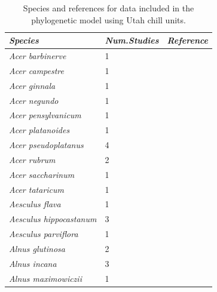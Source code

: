 \documentclass[11pt]{article}
\begin{document}
\begingroup\footnotesize
\begin{longtable}{p{}p{}p{}}
\caption{Species and references for data included in the phylogenetic model using Utah chill units.} \\ 
  \hline
\emph{Species} & \emph{Num.Studies} & \emph{Reference} \\ 
  \hline \endhead  \hline
\emph{Acer barbinerve} &   1 & \emph{\citep{zohner2016}} \\ 
  \emph{Acer campestre} &   1 & \emph{\citep{zohner2016}} \\ 
  \emph{Acer ginnala} &   1 & \emph{\citep{zohner2016}} \\ 
  \emph{Acer negundo} &   1 & \emph{\citep{Laube:2014a}} \\ 
  \emph{Acer pensylvanicum} &   1 & \emph{\citep{flynn2018}} \\ 
  \emph{Acer platanoides} &   1 & \emph{\citep{zohner2016}} \\ 
  \emph{Acer pseudoplatanus} &   4 & \emph{\citep{Basler:2012,Basler:2014aa,Laube:2014a,malyshev2018}} \\ 
  \emph{Acer rubrum} &   2 & \emph{\citep{flynn2018,nanninga17}} \\ 
  \emph{Acer saccharinum} &   1 & \emph{\citep{Webb:1977}} \\ 
  \emph{Acer tataricum} &   1 & \emph{\citep{Laube:2014a}} \\ 
  \emph{Aesculus flava} &   1 & \emph{\citep{zohner2016}} \\ 
  \emph{Aesculus hippocastanum} &   3 & \emph{\citep{Basler:2012,Laube:2014a,zohner2016}} \\ 
  \emph{Aesculus parviflora} &   1 & \emph{\citep{zohner2016}} \\ 
  \emph{Alnus glutinosa} &   2 & \emph{\citep{Heide:1993,Myking:1998aa}} \\ 
  \emph{Alnus incana} &   3 & \emph{\citep{flynn2018,Heide:1993,zohner2016}} \\ 
  \emph{Alnus maximowiczii} &   1 & \emph{\citep{zohner2016}} \\ 

\end{longtable}
\end{document}
